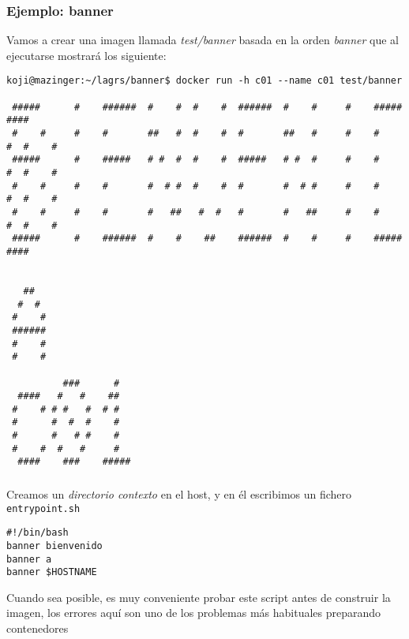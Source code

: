 \documentclass[ucs]{beamer}
\begin{document}
\begin{frame}[fragile]
\frametitle{Ejemplo: banner}
Vamos a crear una imagen llamada
\emph{test/banner}
basada en la orden
\emph{banner}
que al ejecutarse mostrará los siguiente:

  \begin{tiny}
  \begin{verbatim}
koji@mazinger:~/lagrs/banner$ docker run -h c01 --name c01 test/banner

 #####      #    ######  #    #  #    #  ######  #    #     #    #####    ####
 #    #     #    #       ##   #  #    #  #       ##   #     #    #    #  #    #
 #####      #    #####   # #  #  #    #  #####   # #  #     #    #    #  #    #
 #    #     #    #       #  # #  #    #  #       #  # #     #    #    #  #    #
 #    #     #    #       #   ##   #  #   #       #   ##     #    #    #  #    #
 #####      #    ######  #    #    ##    ######  #    #     #    #####    ####


   ##
  #  #
 #    #
 ######
 #    #
 #    #

          ###      #
  ####   #   #    ##
 #    # # #   #  # #
 #      #  #  #    #
 #      #   # #    #
 #    #  #   #     #
  ####    ###    #####
  \end{verbatim}
  \end{tiny}


\end{frame}




\begin{frame}[fragile]
\frametitle{}
Creamos un 
\emph{directorio contexto} 
en el host, y en él escribimos un fichero
\verb|entrypoint.sh|

  \begin{scriptsize}
  \begin{verbatim}
#!/bin/bash
banner bienvenido
banner a
banner $HOSTNAME
  \end{verbatim}
  \end{scriptsize}


Cuando sea posible, es muy conveniente probar este script
antes de construir la imagen, los errores aquí
son uno de los problemas más habituales preparando contenedores


\end{frame}
\end{document}
